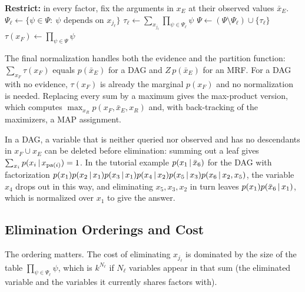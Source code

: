 \begin{algorithm}[H]
\caption{Variable Elimination (Sum-Product)}\label{alg:variable-elimination}
\begin{algorithmic}[1]
\State \textbf{Restrict:} in every factor, fix the arguments in $x_E$ at their observed values $\bar x_E$.
  \State $\Psi_\ell\gets\{\psi\in\Psi:\ \psi\text{ depends on }x_{j_\ell}\}$
  \State $\tau_\ell\gets\sum_{x_{j_\ell}}\prod_{\psi\in\Psi_\ell}\psi$ 
  \State $\Psi\gets(\Psi\setminus\Psi_\ell)\cup\{\tau_\ell\}$
\EndFor
\State $\tau(x_F)\gets\prod_{\psi\in\Psi}\psi$ 
\end{algorithmic}
\end{algorithm}

The final normalization handles both the evidence and the partition function: $\sum_{x_F}\tau(x_F)$ equals $p(\bar x_E)$ for a DAG and $Z\,p(\bar x_E)$ for an MRF. For a DAG with no evidence, $\tau(x_F)$ is already the marginal $p(x_F)$ and no normalization is needed. Replacing every sum by a maximum gives the max-product version, which computes $\max_{x_R}p(x_F,\bar x_E,x_R)$ and, with back-tracking of the maximizers, a MAP assignment.

\begin{remark}
In a DAG, a variable that is neither queried nor observed and has no descendants in $x_F\cup x_E$ can be deleted before elimination: summing out a leaf gives $\sum_{x_i}p(x_i\,|\, x_{\mathrm{pa}(i)})=1$. In the tutorial example $p(x_1\,|\,\bar x_6)$ for the DAG with factorization $p(x_1)p(x_2\,|\, x_1)p(x_3\,|\, x_1)p(x_4\,|\, x_2)p(x_5\,|\, x_3)p(x_6\,|\, x_2,x_5)$, the variable $x_4$ drops out in this way, and eliminating $x_5,x_3,x_2$ in turn leaves $p(x_1)p(\bar x_6\,|\, x_1)$, which is normalized over $x_1$ to give the answer.
\end{remark}

\subsection{Elimination Orderings and Cost}

The ordering matters. The cost of eliminating $x_{j_\ell}$ is dominated by the size of the table $\prod_{\psi\in\Psi_\ell}\psi$, which is $k^{N_\ell}$ if $N_\ell$ variables appear in that sum (the eliminated variable and the variables it currently shares factors with).

